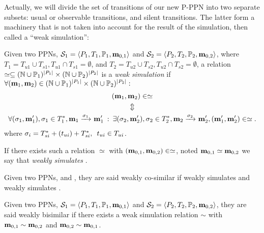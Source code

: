 Actually, we will divide the set of transitions of our new P-PPN into two separate subsets: usual or observable transitions, and silent transitions.
The latter form a machinery that is not taken into account for the result of the simulation, then called a ``weak simulation'':
\begin{defi}
  Given two \acp{PPN}, $\defPPN[1]$ and $\defPPN[2]$,
  where $T_1 = T_{u1} \cup T_{s1}, T_{u1} \cap T_{s1} = \emptyset$,
  and   $T_2 = T_{u2} \cup T_{s2}, T_{u2} \cap T_{s2} = \emptyset$,
  a relation $\simeq \subseteq (\mathbb{N} \cup  \mathbb{P}_1)^{\left|P_1\right|} \times (\mathbb{N} \cup  \mathbb{P}_2)^{\left|P_2\right|}$ is a \emph{weak simulation} if $\forall (\mathbf{m}_1, \mathbf{m}_2) \in (\mathbb{N} \cup  \mathbb{P}_1)^{\left|P_1\right|} \times (\mathbb{N} \cup  \mathbb{P}_2)^{\left|P_2\right|} : $
  \begin{gather*}
    (\mar_1, \mar_2) \in \simeq \\
    \Updownarrow\\
    \forall (\seqt_1,\mar'_1), \seqt_1 \in \transitions_1^*, \mar_1 \fire{\seqt_1} \mar'_1 \>:\>
    \exists (\seqt_2,\mar'_2), \seqt_2 \in \transitions_2^*, \mar_2 \fire{\seqt_2} \mar'_2, (\mar'_1, \mar'_2) \in \simeq.
  \end{gather*}
  where $\seqt_i = \transitions_{si}^* + (t_{ui}) + \transitions_{si}^*,\enspace t_{ui} \in \transitions_{ui}$.%

  If there exists such a relation $\simeq$ with $(\mathbf{m}_{0,1}, \mathbf{m}_{0,2}) \in \simeq$, noted $\mathbf{m}_{0,1} \simeq \mathbf{m}_{0,2}$ we say that \namePPN[2] \emph{weakly simulates} \namePPN[1].
\end{defi}

\begin{defi}
  Given two \acp{PPN}, \namePPN[1] and \namePPN[2],
  they are said weakly co-similar if \namePPN[1] weakly simulates \namePPN[2] and \namePPN[2] weakly simulates \namePPN[1].
\end{defi}

\begin{defi}
  Given two \acp{PPN}, $\defPPN[1]$ and $\defPPN[2]$,
  they are said weakly bisimilar if there exists a weak simulation relation $\sim$ with $\mathbf{m}_{0,1} \sim \mathbf{m}_{0,2}$ and $\mathbf{m}_{0,2} \sim \mathbf{m}_{0,1}$.
\end{defi}

